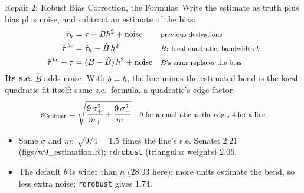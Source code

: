 \documentclass[aspectratio=169,11pt,xcolor=dvipsnames]{beamer}
\newcommand{\srcp}[1]{{\scriptsize\color{gray}(#1)}}
\newcommand{\adv}{\,\raisebox{0.6pt}{\textcolor{accent}{$\bigstar$}}}
\begin{document}
\begin{frame}{Repair 2: Robust Bias Correction, the Formulas\adv}
Write the estimate as truth plus bias plus noise, and subtract an estimate of the bias:
\begin{align*}
  \hat\tau_h &= \tau + Bh^2 + \text{noise}
   && \text{\footnotesize previous derivations} \\
  \hat\tau^{\,bc} &= \hat\tau_h - \hat B\,h^2
   && \text{\footnotesize $\hat B$: local quadratic, bandwidth $b$} \\
  \hat\tau^{\,bc} - \tau &= (B - \hat B)\,h^2 + \text{noise}
   && \text{\footnotesize $\hat B$'s error replaces the bias}
\end{align*}
\textbf{Its s.e.} $\hat B$ adds noise. With $b = h$, the line minus the estimated bend
is the \alert{local quadratic fit itself}: same s.e.\ formula, a quadratic's edge factor.
\begin{align*}
  \text{se}_{\text{robust}} = \sqrt{\frac{9\,\sigma_+^2}{m_+} + \frac{9\,\sigma_-^2}{m_-}}
   && \text{\footnotesize 9 for a quadratic at the edge, 4 for a line}
\end{align*}
\vskip-2pt
\begin{itemize}\itemsep2pt
  \item Same $\sigma$ and $m$: $\sqrt{9/4} = 1.5$ times the line's s.e. Senate: $2.21$
        \srcp{figs/w9\_estimation.R}; \texttt{rdrobust} (triangular weights) 2.06.
  \item The default $b$ is wider than $h$ (28.03 here): more units estimate the bend,
        so less extra noise; \texttt{rdrobust} gives 1.74.
\end{itemize}
\end{frame}
\end{document}
